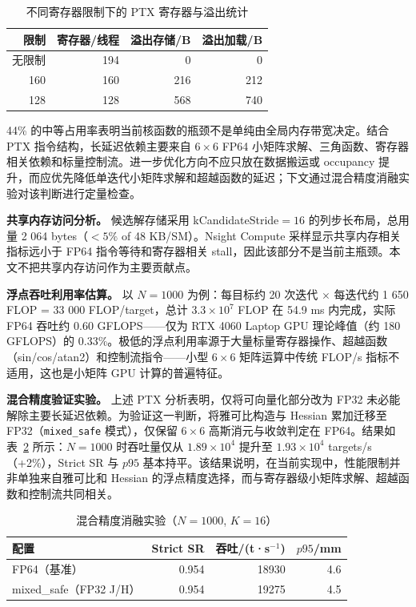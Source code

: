 \documentclass[twocolumn,a4paper,10pt]{ctexart}
\begin{document}
\begin{table}[htbp]
\centering
\caption{不同寄存器限制下的 PTX 寄存器与溢出统计}
\label{tab:regs}
\footnotesize
\setlength{\tabcolsep}{4pt}
\begin{tabular}{rrrr}
\toprule
限制 & 寄存器/线程 & 溢出存储/B & 溢出加载/B\\
\midrule
无限制 & 194 & 0 & 0\\
160 & 160 & 216 & 212\\
128 & 128 & 568 & 740\\
\bottomrule
\end{tabular}
\end{table}

44\% 的中等占用率表明当前核函数的瓶颈不是单纯由全局内存带宽决定。结合 PTX 指令结构，长延迟依赖主要来自 $6\times6$ FP64 小矩阵求解、三角函数、寄存器相关依赖和标量控制流。进一步优化方向不应只放在数据搬运或 occupancy 提升，而应优先降低单迭代小矩阵求解和超越函数的延迟；下文通过混合精度消融实验对该判断进行定量检查。

\textbf{共享内存访问分析。} 候选解存储采用 kCandidateStride$=16$ 的列步长布局，总用量 2 064 bytes（$<5\%$ of 48 KB/SM）。Nsight Compute 采样显示共享内存相关指标远小于 FP64 指令等待和寄存器相关 stall，因此该部分不是当前主瓶颈。本文不把共享内存访问作为主要贡献点。

\textbf{浮点吞吐利用率估算。} 以 $N=1000$ 为例：每目标约 20 次迭代 $\times$ 每迭代约 1 650 FLOP = 33 000 FLOP/target，总计 $3.3\times10^7$ FLOP 在 54.9 ms 内完成，实际 FP64 吞吐约 0.60 GFLOPS——仅为 RTX 4060 Laptop GPU 理论峰值（约 180 GFLOPS）的 0.33\%。极低的浮点利用率源于大量标量寄存器操作、超越函数（sin/cos/atan2）和控制流指令——小型 $6\times6$ 矩阵运算中传统 FLOP/s 指标不适用，这也是小矩阵 GPU 计算的普遍特征。

\textbf{混合精度验证实验。} 上述 PTX 分析表明，仅将可向量化部分改为 FP32 未必能解除主要长延迟依赖。为验证这一判断，将雅可比构造与 Hessian 累加迁移至 FP32（\texttt{mixed\_safe} 模式），仅保留 $6\times6$ 高斯消元与收敛判定在 FP64。结果如表~\ref{tab:mixed} 所示：$N=1000$ 时吞吐量仅从 $1.89\times10^4$ 提升至 $1.93\times10^4$ targets/s（+2\%），Strict SR 与 $p95$ 基本持平。该结果说明，在当前实现中，性能限制并非单独来自雅可比和 Hessian 的浮点精度选择，而与寄存器级小矩阵求解、超越函数和控制流共同相关。

\begin{table}[htbp]
\centering
\caption{混合精度消融实验（$N{=}1000$, $K{=}16$）}
\label{tab:mixed}
\scriptsize
\setlength{\tabcolsep}{3pt}
\begin{tabular}{lrrr}
\toprule
配置 & Strict SR & 吞吐/(t·s$^{-1}$) & $p95$/mm\\
\midrule
FP64（基准） & 0.954 & 18930 & 4.6\\
mixed\_safe（FP32 J/H） & 0.954 & 19275 & 4.5\\
\bottomrule
\end{tabular}
\end{table}
\end{document}
